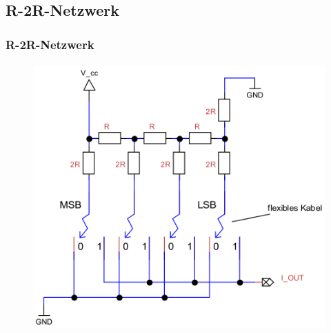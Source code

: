 \subsection{R-2R-Netzwerk} %
\label{sub:R-2R-Netzwerk}
\begin{frame}
    \frametitle{R-2R-Netzwerk}
    \framesubtitle{}
    \begin{figure}[H]
        \begin{center}
                \includegraphics[scale=0.5]{./img/schaltung/r2r_0.png}
        \end{center}
    \end{figure}
\end{frame}

